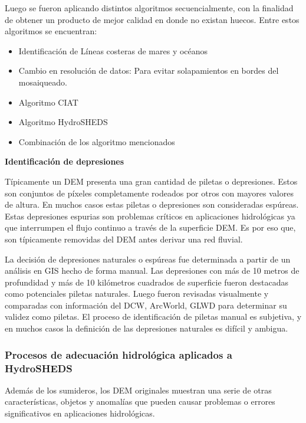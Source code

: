 \documentclass[10pt,a4paper, twoside]{report}
\begin{document}
Luego se fueron aplicando distintos algoritmos secuencialmente, con la finalidad de obtener un producto de mejor calidad en donde no existan huecos. Entre estos algoritmos se encuentran:

\begin{itemize}
	\item Identificación de Líneas costeras de mares y océanos
	\item Cambio en resolución de datos: Para evitar solapamientos en bordes del mosaiqueado.
	\item Algoritmo CIAT
	\item Algoritmo HydroSHEDS
	\item Combinación de los algoritmo mencionados
\end{itemize}


\textbf{Identificación de depresiones}

Típicamente un DEM presenta una gran cantidad de piletas o depresiones. Estos son conjuntos de píxeles completamente rodeados por otros con mayores valores de altura. En muchos casos estas piletas o depresiones son consideradas espúreas. Estas depresiones espurias son problemas críticos en aplicaciones hidrológicas ya que interrumpen el flujo continuo a través de la superficie DEM. Es por eso que, son típicamente removidas del DEM antes derivar una red fluvial.

La decisión de depresiones naturales o espúreas fue determinada a partir de un análisis en GIS hecho de forma manual. Las depresiones con más de 10 metros de profundidad y más de 10 kilómetros cuadrados de superficie fueron destacadas como potenciales piletas naturales. Luego fueron revisadas visualmente y comparadas con información del DCW, ArcWorld, GLWD para determinar su validez como piletas. El proceso de identificación de piletas manual es subjetiva, y en muchos casos la definición de las depresiones naturales es difícil y ambigua.


\subsubsection{Procesos de adecuación hidrológica aplicados a HydroSHEDS}

Además de los sumideros, los DEM originales muestran una serie de otras características, objetos y anomalías que pueden causar problemas o errores significativos en aplicaciones hidrológicas.
\end{document}
